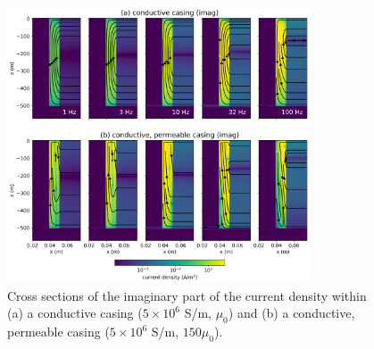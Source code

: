 \begin{figure}
    \begin{center}
    \includegraphics[width=0.8\textwidth]{figures/fdem-casing-currents-imag.png}
    \end{center}
\caption{
    Cross sections of the imaginary part of the current density within (a) a conductive casing ($5\times10^6$ S/m, $\mu_0$) and (b) a conductive, permeable casing ($5\times10^6$ S/m, $150\mu_0$).
}
\label{fig:fdem-casing-currents-imag}
\end{figure}



